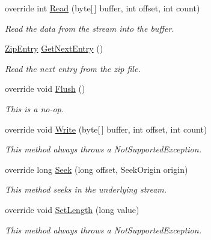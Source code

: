 \begin{DoxyCompactItemize}
override int \mbox{\hyperlink{class_super_tiled2_unity_1_1_ionic_1_1_zip_1_1_zip_input_stream_a172a23a02d3c7a34db7c6648c55fd299}{Read}} (byte\mbox{[}$\,$\mbox{]} buffer, int offset, int count)
\begin{DoxyCompactList}\small\item\em Read the data from the stream into the buffer. \end{DoxyCompactList}\item 
\mbox{\hyperlink{class_super_tiled2_unity_1_1_ionic_1_1_zip_1_1_zip_entry}{Zip\+Entry}} \mbox{\hyperlink{class_super_tiled2_unity_1_1_ionic_1_1_zip_1_1_zip_input_stream_afd108d06a4650f63b0ec80d0698fc886}{Get\+Next\+Entry}} ()
\begin{DoxyCompactList}\small\item\em Read the next entry from the zip file. \end{DoxyCompactList}\item 
override void \mbox{\hyperlink{class_super_tiled2_unity_1_1_ionic_1_1_zip_1_1_zip_input_stream_aeb026d271ed4735218e0a828e894bfb2}{Flush}} ()
\begin{DoxyCompactList}\small\item\em This is a no-\/op. \end{DoxyCompactList}\item 
override void \mbox{\hyperlink{class_super_tiled2_unity_1_1_ionic_1_1_zip_1_1_zip_input_stream_a17ea725c822fa0c237288944bc4e9263}{Write}} (byte\mbox{[}$\,$\mbox{]} buffer, int offset, int count)
\begin{DoxyCompactList}\small\item\em This method always throws a Not\+Supported\+Exception. \end{DoxyCompactList}\item 
override long \mbox{\hyperlink{class_super_tiled2_unity_1_1_ionic_1_1_zip_1_1_zip_input_stream_ab18b42888a3f6495b8afd7bc667edb5f}{Seek}} (long offset, Seek\+Origin origin)
\begin{DoxyCompactList}\small\item\em This method seeks in the underlying stream. \end{DoxyCompactList}\item 
override void \mbox{\hyperlink{class_super_tiled2_unity_1_1_ionic_1_1_zip_1_1_zip_input_stream_a30b3d9819a30af02a5edcf31a20095f7}{Set\+Length}} (long value)
\begin{DoxyCompactList}\small\item\em This method always throws a Not\+Supported\+Exception. \end{DoxyCompactList}\end{DoxyCompactItemize}

